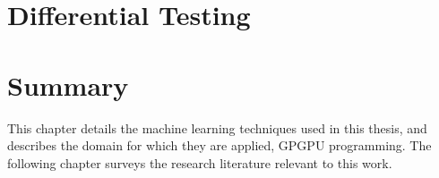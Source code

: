 




\section{Differential Testing}



\section{Summary}
\label{subsec:background-summary}

This chapter details the machine learning techniques used in this thesis, and describes the domain for which they are applied, GPGPU programming. The following chapter surveys the research literature relevant to this work.
